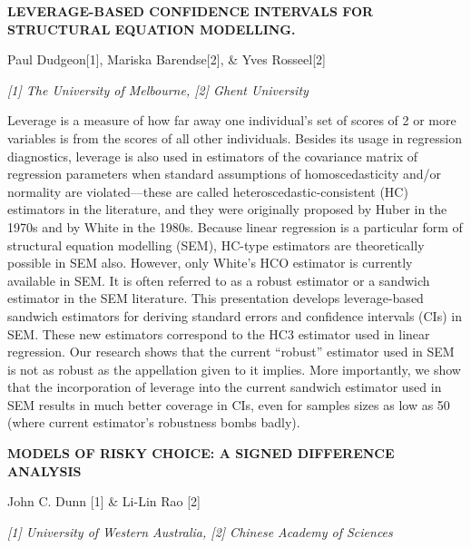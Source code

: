 \documentclass[]{article}
\begin{document}
\textbf{LEVERAGE-BASED CONFIDENCE INTERVALS FOR STRUCTURAL EQUATION
MODELLING.}

Paul Dudgeon{[}1{]}, Mariska Barendse{[}2{]}, \& Yves Rosseel{[}2{]}

\emph{{[}1{]} The University of Melbourne, {[}2{]} Ghent University}

Leverage is a measure of how far away one individual's set of scores of
2 or more variables is from the scores of all other individuals. Besides
its usage in regression diagnostics, leverage is also used in estimators
of the covariance matrix of regression parameters when standard
assumptions of homoscedasticity and/or normality are violated---these
are called heteroscedastic-consistent (HC) estimators in the literature,
and they were originally proposed by Huber in the 1970s and by White in
the 1980s. Because linear regression is a particular form of structural
equation modelling (SEM), HC-type estimators are theoretically possible
in SEM also. However, only White's HCO estimator is currently available
in SEM. It is often referred to as a robust estimator or a sandwich
estimator in the SEM literature. This presentation develops
leverage-based sandwich estimators for deriving standard errors and
confidence intervals (CIs) in SEM. These new estimators correspond to
the HC3 estimator used in linear regression. Our research shows that the
current ``robust'' estimator used in SEM is not as robust as the
appellation given to it implies. More importantly, we show that the
incorporation of leverage into the current sandwich estimator used in
SEM results in much better coverage in CIs, even for samples sizes as
low as 50 (where current estimator's robustness bombs badly).

\textbf{MODELS OF RISKY CHOICE: A SIGNED DIFFERENCE ANALYSIS}

John C. Dunn {[}1{]} \& Li-Lin Rao {[}2{]}

\emph{{[}1{]} University of Western Australia, {[}2{]} Chinese Academy
of Sciences}
\end{document}
